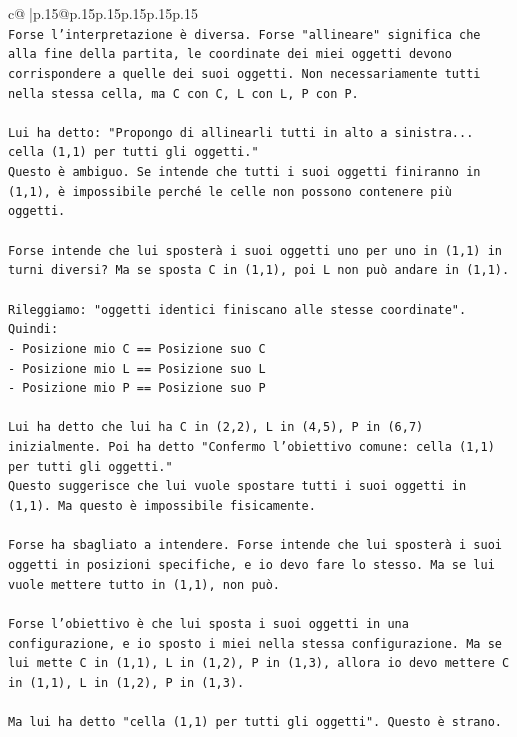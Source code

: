 \documentclass{article}
\begin{document}
{\begin{supertabular}{c@{$\;$}|p{.15\linewidth}@{}p{.15\linewidth}p{.15\linewidth}p{.15\linewidth}p{.15\linewidth}p{.15\linewidth}}
{{{\\ 
\texttt{Forse l'interpretazione è diversa. Forse "allineare" significa che alla fine della partita, le coordinate dei miei oggetti devono corrispondere a quelle dei suoi oggetti. Non necessariamente tutti nella stessa cella, ma C con C, L con L, P con P.} \\
\\ 
\texttt{Lui ha detto: "Propongo di allinearli tutti in alto a sinistra... cella (1,1) per tutti gli oggetti."} \\
\texttt{Questo è ambiguo. Se intende che tutti i suoi oggetti finiranno in (1,1), è impossibile perché le celle non possono contenere più oggetti.} \\
\\ 
\texttt{Forse intende che lui sposterà i suoi oggetti uno per uno in (1,1) in turni diversi? Ma se sposta C in (1,1), poi L non può andare in (1,1).} \\
\\ 
\texttt{Rileggiamo: "oggetti identici finiscano alle stesse coordinate".} \\
\texttt{Quindi:} \\
\texttt{{-} Posizione mio C == Posizione suo C} \\
\texttt{{-} Posizione mio L == Posizione suo L} \\
\texttt{{-} Posizione mio P == Posizione suo P} \\
\\ 
\texttt{Lui ha detto che lui ha C in (2,2), L in (4,5), P in (6,7) inizialmente. Poi ha detto "Confermo l'obiettivo comune: cella (1,1) per tutti gli oggetti."} \\
\texttt{Questo suggerisce che lui vuole spostare tutti i suoi oggetti in (1,1). Ma questo è impossibile fisicamente.} \\
\\ 
\texttt{Forse ha sbagliato a intendere. Forse intende che lui sposterà i suoi oggetti in posizioni specifiche, e io devo fare lo stesso. Ma se lui vuole mettere tutto in (1,1), non può.} \\
\\ 
\texttt{Forse l'obiettivo è che lui sposta i suoi oggetti in una configurazione, e io sposto i miei nella stessa configurazione. Ma se lui mette C in (1,1), L in (1,2), P in (1,3), allora io devo mettere C in (1,1), L in (1,2), P in (1,3).} \\
\\ 
\texttt{Ma lui ha detto "cella (1,1) per tutti gli oggetti". Questo è strano.} \\
}}}
\end{supertabular}}
\end{document}
